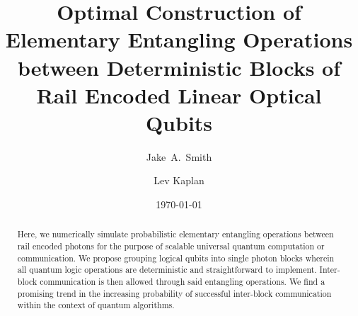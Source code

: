 \documentclass[aps,pra,twocolumn,showpacs,superscriptaddress,floatfix,10pt]{revtex4}
\begin{document}
\newcommand{\beq}{\begin{equation}}
\newcommand{\eeq}{\end{equation}}
\newcommand{\ben}{\begin{eqnarray}}
\newcommand{\een}{\end{eqnarray}}
\newcommand{\bea}{\begin{array}}
\newcommand{\eea}{\end{array}}
\newcommand{\om}{(\omega )}
\newcommand{\bef}{\begin{figure}}
\newcommand{\eef}{\end{figure}}
\newcommand{\leg}[1]{\caption{\protect\rm{\protect\footnotesize{#1}}}}
\newcommand{\ew}[1]{\langle{#1}\rangle}
\newcommand{\be}[1]{\mid\!{#1}\!\mid}
\newcommand{\no}{\nonumber}
\newcommand{\etal}{{\em et~al }}
\newcommand{\geff}{g_{\mbox{\it{\scriptsize{eff}}}}}
\newcommand{\da}[1]{{#1}^\dagger}
\newcommand{\cf}{{\it cf.\/}\ }
\newcommand{\ie}{{\it i.e.\/}\ }   

\newcommand{\spazio}{\vspace{0.3cm}}%
\newcommand{\de}[1]{\frac{\partial}{\partial{#1}}}
\newcommand{\U}{\tilde{U}}
\newcommand{\V}{\tilde{V}}


\title{Optimal Construction of Elementary Entangling Operations between Deterministic Blocks of Rail Encoded Linear Optical Qubits}

\author{Jake~A.~Smith}

\author{Lev Kaplan}

 \begin{abstract}
Here, we numerically simulate probabilistic elementary entangling operations between rail encoded photons for the purpose of scalable universal quantum computation or communication. We propose grouping logical qubits into single photon blocks wherein all quantum logic operations are deterministic and straightforward to implement. Inter-block communication is then allowed through said entangling operations. We find a promising trend in the increasing probability of successful inter-block communication within the context of quantum algorithms.
\end{abstract}                                                               
\date{\today}
\pacs{***}
\maketitle
\end{document}

